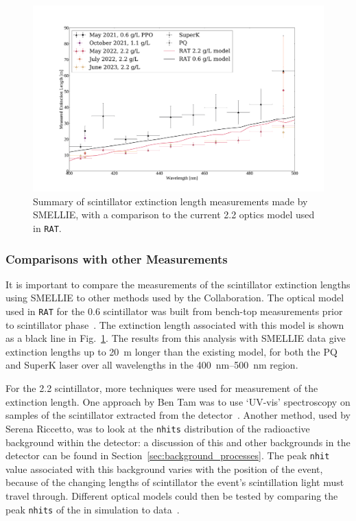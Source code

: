 \begin{figure}
    \centering
    \includegraphics[width=\textwidth]{5_SMELLIEAnalysis/images/ext_length_results_summary.pdf}
    \caption[Summary of scintillator extinction length measurements made by SMELLIE]
    {Summary of scintillator extinction length measurements made by SMELLIE, with a comparison to the current \SI{2.2}{\gpl} optics model used in \texttt{RAT}.}
    \label{fig:smellie_ext_length_final_results}
\end{figure}

\subsubsection{Comparisons with other Measurements}\label{sec:smellie_ext_length_comparison}
It is important to compare the measurements of the scintillator extinction lengths using SMELLIE to other methods used by the Collaboration. The optical model used in \texttt{RAT} for the \SI{0.6}{\gpl} scintillator was built from bench-top measurements prior to scintillator phase~\cite{seguiScintillatorModelComparison2015,kaptanogluOpticsOverviewProposed2016}. The extinction length associated with this model is shown as a black line in Fig.~\ref{fig:smellie_ext_length_final_results}. The results from this analysis with SMELLIE data give extinction lengths up to \SI{20}{\metre} longer than the existing model, for both the PQ and SuperK laser over all wavelengths in the \SIrange{400}{500}{\nm} region.

For the \SI{2.2}{\gpl} scintillator, more techniques were used for measurement of the extinction length. One approach by Ben Tam was to use `UV-vis' spectroscopy on samples of the scintillator extracted from the detector~\cite{tamBenchtopAttenuationMeasurements2022,tamEnablingNeutrinolessDoubleBeta2023}. %
Another method, used by Serena Riccetto, was to look at the \texttt{nhits} distribution of the radioactive background  within the detector: a discussion of this and other backgrounds in the detector can be found in Section~\ref{sec:background_processes}. The peak \texttt{nhit} value associated with this background varies with the position of the event, because of the changing lengths of scintillator the event's scintillation light must travel through. Different optical models could then be tested by comparing the peak \texttt{nhits} of the  in simulation to data~\cite{riccettoFullFill2102022}. %

